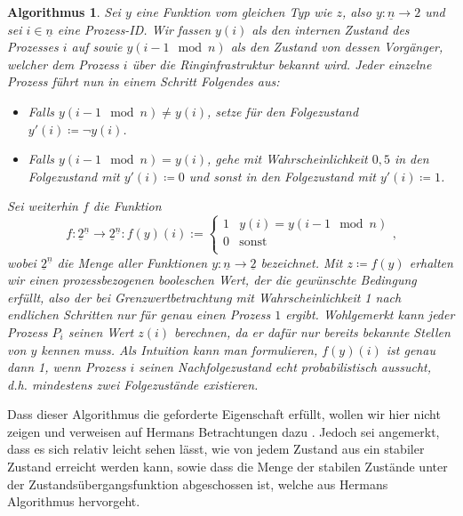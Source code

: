\documentclass[a4paper]{article}
\newtheorem{algorithmus}[satz]{Algorithmus}
\theoremstyle{nonumberplain}
\begin{document}
\begin{algorithmus}\label{alg-herman}
	Sei $y$ eine Funktion vom gleichen Typ wie $z$, also $y : \underline{n} \to 2$ und sei $i \in \underline{n}$ eine Prozess-ID. Wir fassen $y(i)$ als den internen Zustand des Prozesses $i$ auf sowie $y(i - 1 \mod n)$ als den Zustand von dessen Vorgänger, welcher dem Prozess $i$ über die Ringinfrastruktur bekannt wird. Jeder einzelne Prozess führt nun in einem Schritt Folgendes aus:
	\begin{itemize}
		\item Falls $y(i-1 \mod n) \neq y(i)$, setze für den Folgezustand $y'(i) \coloneqq \neg y(i)$.
		\item Falls $y(i-1 \mod n) =    y(i)$, gehe mit Wahrscheinlichkeit $0,5$ in den Folgezustand mit $y'(i) \coloneqq 0$ und sonst in den Folgezustand mit $y'(i) \coloneqq 1$.
	\end{itemize}
	Sei weiterhin $f$ die Funktion
	\begin{equation}
		f : \underline{2}^{\underline{n}} \to \underline{2}^{\underline{n}} : f(y)(i) :=  \begin{cases}
		1 & y(i) = y(i-1 \mod n)\\
		0 & \text{sonst}\\
		\end{cases}\text{,}
	\end{equation}
	wobei $\underline{2}^{\underline{n}}$ die Menge aller Funktionen $y : \underline{n}\to\underline{2}$ bezeichnet.
	Mit $z \coloneqq f(y)$ erhalten wir einen prozessbezogenen booleschen Wert, der die gewünschte Bedingung erfüllt, also der bei Grenzwertbetrachtung mit Wahrscheinlichkeit 1 nach endlichen Schritten nur für genau einen Prozess $1$ ergibt. Wohlgemerkt kann jeder Prozess $P_i$ seinen Wert $z(i)$ berechnen, da er dafür nur bereits bekannte Stellen von $y$ kennen muss. Als Intuition kann man formulieren, $f(y)(i)$ ist genau dann 1, wenn Prozess $i$ seinen Nachfolgezustand echt probabilistisch aussucht, d.h. mindestens zwei Folgezustände existieren.
\end{algorithmus}

Dass dieser Algorithmus die geforderte Eigenschaft erfüllt, wollen wir hier nicht zeigen und verweisen auf Hermans Betrachtungen dazu \cite{Her90}. Jedoch sei angemerkt, dass es sich relativ leicht sehen lässt, wie von jedem Zustand aus ein stabiler Zustand erreicht werden kann, sowie dass die Menge der stabilen Zustände unter der Zustandsübergangsfunktion abgeschossen ist, welche aus Hermans Algorithmus hervorgeht.
\end{document}
